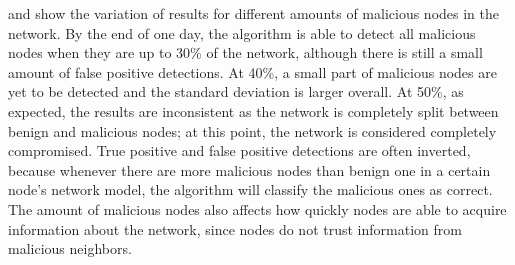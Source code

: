 
\pagebreak
{} and  show the variation of results for different amounts of malicious nodes in the network.
By the end of one day, the algorithm is able to detect all malicious nodes when they are up to 30\% of the network, although there is still a small amount of false positive detections.
At 40\%, a small part of malicious nodes are yet to be detected and the standard deviation is larger overall.
At 50\%, as expected, the results are inconsistent as the network is completely split between benign and malicious nodes; at this point, the network is considered completely compromised.
True positive and false positive detections are often inverted, because whenever there are more malicious nodes than benign one in a certain node's network model, the algorithm will classify the malicious ones as correct.
The amount of malicious nodes also affects how quickly nodes are able to acquire information about the network, since nodes do not trust information from malicious neighbors.

